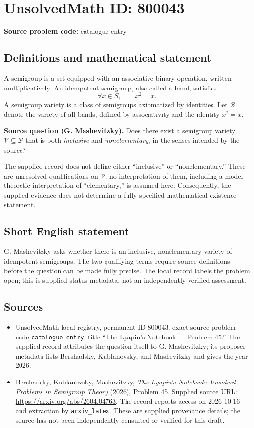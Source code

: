 \documentclass[11pt]{article}
\begin{document}
\section*{UnsolvedMath ID: 800043}
\textbf{Source problem code:} catalogue entry
\subsection{Definitions and mathematical statement}
A semigroup is a set equipped with an associative binary operation, written multiplicatively. An idempotent semigroup, also called a band, satisfies
\[
\forall x\in S,\qquad x^2=x.
\]
A semigroup variety is a class of semigroups axiomatized by identities. Let \(\mathcal B\) denote the variety of all bands, defined by associativity and the identity \(x^2=x\).

\textbf{Source question (G. Mashevitzky).} Does there exist a semigroup variety \(\mathcal V\subseteq\mathcal B\) that is both \emph{inclusive} and \emph{nonelementary}, in the senses intended by the source?

The supplied record does not define either ``inclusive'' or ``nonelementary.'' These are unresolved qualifications on \(\mathcal V\); no interpretation of them, including a model-theoretic interpretation of ``elementary,'' is assumed here. Consequently, the supplied evidence does not determine a fully specified mathematical existence statement.
\subsection{Short English statement}
G. Mashevitzky asks whether there is an inclusive, nonelementary variety of idempotent semigroups. The two qualifying terms require source definitions before the question can be made fully precise. The local record labels the problem open; this is supplied status metadata, not an independently verified assessment.
\subsection{Sources}
\begin{itemize}
\item UnsolvedMath local registry, permanent ID \(800043\), exact source problem code \texttt{catalogue entry}, title ``The Lyapin's Notebook --- Problem 45.'' The supplied record attributes the question itself to G. Mashevitzky; its proposer metadata lists Bershadsky, Kublanovsky, and Mashevitzky and gives the year 2026.
\item Bershadsky, Kublanovsky, Mashevitzky, \emph{The Lyapin's Notebook: Unsolved Problems in Semigroup Theory} (2026), Problem 45. Supplied source URL: \url{https://arxiv.org/abs/2604.04763}. The record reports access on 2026-10-16 and extraction by \texttt{arxiv\_latex}. These are supplied provenance details; the source has not been independently consulted or verified for this draft.
\end{itemize}
\end{document}

